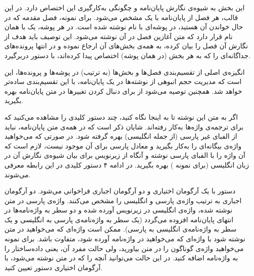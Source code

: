 
این بخش به شیوه‌ی نگارش پایان‌نامه و چگونگی به‌کارگیری این  اختصاص دارد.
در این قالب، هر فصل از پایان‌نامه با یک  مشخص می‌شود. برای نمونه، فصل مقدمه که در حال خواندن آن هستید، در پوشه‌ای با نام  نوشته شده است. در هر پوشه، یک  با همان نام قرار دارد که متن آغازین فصل در آن نوشته می‌شود. این توصیف باید هدف از نگارش آن فصل را بیان کرده، به همه‌ی بخش‌های آن ارجاع نموده و در انتها پرونده‌های جداگانه‌ای را که به هر بخش (در همان پوشه) اختصاص پیدا کرده‌اند، با دستور  دربرگیرد.

انگیزه‌ی اصلی از تقسیم‌بندی فصل‌ها و بخش‌ها (به ترتیب) در پوشه‌ها و پرونده‌ها، این است که مدیریت حجم انبوهی از نوشته‌ها در یک پایان‌نامه، با این تقسیم‌بندی ساده‌تر خواهد شد. همچنین توصیه می‌شود از   برای دنبال کردن تغییرها در متن پایان‌نامه بهره بگیرید.

اگر به متن  این نوشته تا به اینجا نگاه کنید، چند دستور کلیدی را مشاهده می‌کنید که برای ترجمه‌ی واژه‌ها به‌کار رفته‌اند. شایان ذکر است که در همه‌ی متن پایان‌نامه، نباید از الفبای غیر پارسی (از جمله انگلیسی) بهره گرفته شود. در صورتی که می‌خواهید واژه‌ی بیگانه‌ای را به‌کار بگیرید و معادل پارسی برای آن موجود نیست، لازم است که آن واژه را با الفبای پارسی نوشته و آنگاه از زیرنویس برای بیان شیوه‌ی نگارش آن در زبان انگلیسی (برای نمونه ) بهره  بگیرید. در ادامه ۴ دستور کلیدی در این رابطه معرفی می‌شوند.

	 دستور  با یک آرگومان اختیاری و دو آرگومان اجباری فراخوانی می‌شود. دو آرگومان اجباری به ترتیب واژه‌ی پارسی و انگلیسی را مشخص می‌کنند. واژه‌ی پارسی در متن نوشته شده، واژه‌ی انگلیسی در زیرنویس آورده شده و دو سطر به واژه‌نامه‌ها در انتهای پایان‌نامه افزوده می‌گردد (یک سطر به واژه‌نامه‌ی پارسی به انگلیسی و یک سطر به واژه‌نامه‌ی انگلیسی به پارسی). ممکن است واژه‌ای که می‌خواهید در متن نوشته شود با واژه‌ای که می‌خواهید در واژه‌نامه آورده شود، متفاوت باشد. برای نمونه می‌خواهید واژه‌ی  گوناگون را در متن بیاورید، ولی حالت مفرد آن، یعنی داده‌ساختار را به واژه‌نامه اضافه کنید. در این حالت می‌توانید آنچه را که در متن نوشته می‌شود، با آرگومان اختیاری دستور  تعیین کنید.
	
